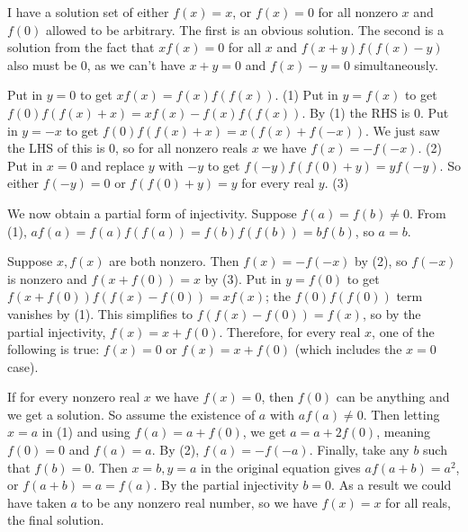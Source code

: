 \begin{solution}
	I have a solution set of either $f(x) = x$, or $f(x) = 0$ for all nonzero $x$ and $f(0)$ allowed to be arbitrary. The first is an obvious solution. The second is a solution from the fact that $xf(x) = 0$ for all $x$ and $f(x+y)f(f(x)-y)$ also must be 0, as we can't have $x+y = 0$ and $f(x)-y = 0$ simultaneously.

Put in $y = 0$ to get $xf(x) = f(x)f(f(x))$. (1)
Put in $y = f(x)$ to get $f(0)f(f(x)+x) = xf(x)-f(x)f(f(x))$. By (1) the RHS is 0. Put in $y = -x$ to get $f(0)f(f(x)+x) = x(f(x)+f(-x))$. We just saw the LHS of this is 0, so for all nonzero reals $x$ we have $f(x) = -f(-x)$. (2)
Put in $x = 0$ and replace $y$ with $-y$ to get $f(-y)f(f(0)+y) = yf(-y)$. So either $f(-y) = 0$ or $f(f(0)+y) = y$ for every real $y$. (3)

We now obtain a partial form of injectivity. Suppose $f(a) = f(b) \neq 0$. From (1), $af(a) = f(a)f(f(a)) = f(b)f(f(b)) = bf(b)$, so $a = b$.

Suppose $x, f(x)$ are both nonzero. Then $f(x) = -f(-x)$ by (2), so $f(-x)$ is nonzero and $f(x+f(0)) = x$ by (3). Put in $y = f(0)$ to get $f(x+f(0))f(f(x)-f(0)) = xf(x)$; the $f(0)f(f(0))$ term vanishes by (1). This simplifies to $f(f(x)-f(0)) = f(x)$, so by the partial injectivity, $f(x) = x+f(0)$. Therefore, for every real $x$, one of the following is true: $f(x) = 0$ or $f(x) = x+f(0)$ (which includes the $x = 0$ case).

If for every nonzero real $x$ we have $f(x) = 0$, then $f(0)$ can be anything and we get a solution. So assume the existence of $a$ with $af(a) \neq 0$. Then letting $x = a$ in (1) and using $f(a) = a+f(0)$, we get $a = a+2f(0)$, meaning $f(0) = 0$ and $f(a) = a$. By (2), $f(a) = -f(-a)$. Finally, take any $b$ such that $f(b) = 0$. Then $x = b, y = a$ in the original equation gives $af(a+b) = a^2$, or $f(a+b) = a = f(a)$. By the partial injectivity $b = 0$. As a result we could have taken $a$ to be any nonzero real number, so we have $f(x) = x$ for all reals, the final solution.
\end{solution}



